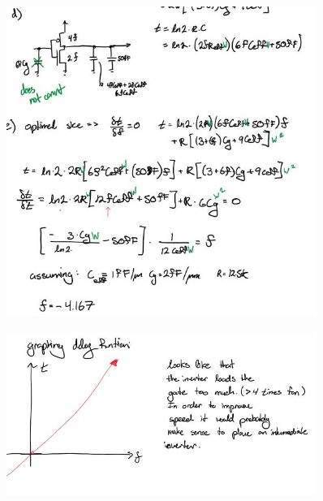 \documentclass[11pt]{article}
\begin{document}
\begin{figure}[H]
\centering
  \includegraphics[width=0.9\textwidth]{delay2.jpg}
\end{figure}

\begin{figure}[H]
\centering
  \includegraphics[width=0.9\textwidth]{delay3.jpg}
\end{figure}
\end{document}
